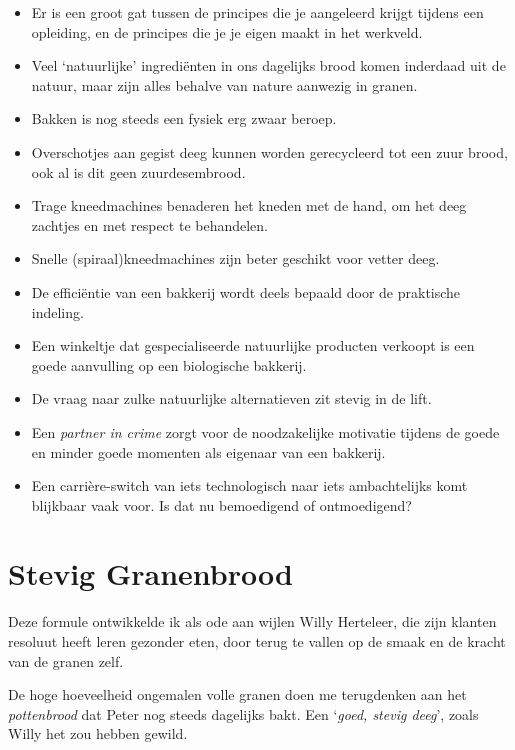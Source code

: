 \documentclass[
  11pt,
  dutch,
]{memoir}
\providecommand{\tightlist}{%
  \setlength{\itemsep}{0pt}\setlength{\parskip}{0pt}}
\begin{document}
\begin{itemize}
\tightlist
\item
  Er is een groot gat tussen de principes die je aangeleerd krijgt
  tijdens een opleiding, en de principes die je je eigen maakt in het
  werkveld.
\item
  Veel `natuurlijke' ingrediënten in ons dagelijks brood komen inderdaad
  uit de natuur, maar zijn alles behalve van nature aanwezig in granen.
\item
  Bakken is nog steeds een fysiek erg zwaar beroep.
\item
  Overschotjes aan gegist deeg kunnen worden gerecycleerd tot een zuur
  brood, ook al is dit geen zuurdesembrood.
\item
  Trage kneedmachines benaderen het kneden met de hand, om het deeg
  zachtjes en met respect te behandelen.
\item
  Snelle (spiraal)kneedmachines zijn beter geschikt voor vetter deeg.
\item
  De efficiëntie van een bakkerij wordt deels bepaald door de praktische
  indeling.
\item
  Een winkeltje dat gespecialiseerde natuurlijke producten verkoopt is
  een goede aanvulling op een biologische bakkerij.
\item
  De vraag naar zulke natuurlijke alternatieven zit stevig in de lift.
\item
  Een \emph{partner in crime} zorgt voor de noodzakelijke motivatie
  tijdens de goede en minder goede momenten als eigenaar van een
  bakkerij.
\item
  Een carrière-switch van iets technologisch naar iets ambachtelijks
  komt blijkbaar vaak voor. Is dat nu bemoedigend of ontmoedigend?
\end{itemize}

\newpage

\hypertarget{stevig-granenbrood}{%
\section{Stevig Granenbrood}\label{stevig-granenbrood}}

\label{granenbrood}

Deze formule ontwikkelde ik als ode aan wijlen Willy Herteleer, die zijn
klanten resoluut heeft leren gezonder eten, door terug te vallen op de
smaak en de kracht van de granen zelf.

De hoge hoeveelheid ongemalen volle granen doen me terugdenken aan het
\emph{pottenbrood} dat Peter nog steeds dagelijks bakt. Een `\emph{goed,
stevig deeg}', zoals Willy het zou hebben gewild.
\end{document}

